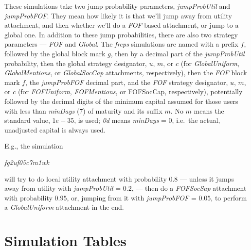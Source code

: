 \documentclass[10pt,oneside]{memoir}
\begin{document}
\begin{Spacing}{2}
These simulations take two jump probability parameters, {\itshape jumpProbUtil} and {\itshape jumpProbFOF}.  They mean how likely it is that we'll jump away from utility attachment, and then whether we'll do a {\itshape FOF}-based attachment, or jump to a global one.  In addition to these jump probabilities, there are also two strategy parameters --- {\itshape FOF} and {\itshape Global}.
The {\itshape freps} simulations are named with a prefix $f$, followed by the global block mark $g$, then by a decimal part of the {\itshape jumpProbUtil} probability, then the global strategy designator, $u$, $m$, or $c$ (for {\itshape GlobalUniform}, {\itshape GlobalMentions}, or {\itshape GlobalSocCap} attachments, respectively), then the {\itshape FOF} block mark $f$, the {\itshape jumpProbFOF} decimal part, and the {\itshape FOF} strategy designator, $u$, $m$, or $c$ (for {\itshape FOFUniform}, {\itshape FOFMentions}, or FOFSocCap, respectively), potentially followed by the decimal digits of the minimum capital assumed for those users with less than {\itshape minDays} (7) of maturity and its suffix $m$.  No $m$ means the standard value, $1e-35$, is used; {\itshape 0d} means {\itshape minDays} = $0$, i.e.\ the actual, unadjusted capital is always used.


E.g., the simulation


{\itshape fg2uf05c7m1wk}


will try to do local utility attachment with probability $0.8$ --- unless it jumps away from utility with {\itshape jumpProbUtil} = $0.2$, --- then do a {\itshape FOFSocSap} attachment with probability $0.95$, or, jumping from it with {\itshape jumpProbFOF} = $0.05$, to perform a {\itshape GlobalUniform} attachment in the end.


\section{Simulation Tables}
\label{simulationtables}


\end{Spacing}
\end{document}
